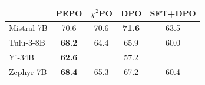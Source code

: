 \small
\begin{tabular}{lcccc}
\toprule
 & PEPO & $\chi^2$PO & DPO & SFT+DPO \\
\midrule
Mistral-7B & 70.6 & 70.6 & \textbf{71.6} & 63.5 \\
Tulu-3-8B & \textbf{68.2} & 64.4 & 65.9 & 60.0 \\
Yi-34B & \textbf{62.6} &  & 57.2 &  \\
Zephyr-7B & \textbf{68.4} & 65.3 & 67.2 & 60.4 \\
\bottomrule
\end{tabular}
